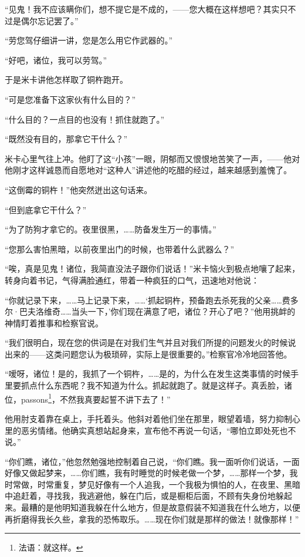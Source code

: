 \par “见鬼！我不应该瞒你们，想不提它是不成的，——您大概在这样想吧？其实只不过是偶尔忘记罢了。”
\par “劳您驾仔细讲一讲，您是怎么用它作武器的。”
\par “好吧，诸位，我可以劳驾。”
\par 于是米卡讲他怎样取了铜杵跑开。
\par “可是您准备下这家伙有什么目的？”
\par “什么目的？一点目的也没有！抓住就跑了。”
\par “既然没有目的，那拿它干什么？”
\par 米卡心里气往上冲。他盯了这“小孩”一眼，阴郁而又恨恨地苦笑了一声，——他对他刚才这样诚恳而自愿地对“这种人”讲述他的吃醋的经过，越来越感到羞愧了。
\par “这倒霉的铜杵！”他突然迸出这句话来。
\par “但到底拿它干什么？”
\par “为了防狗才拿它的。夜里很黑，……防备发生万一的事情。”
\par “您那么害怕黑暗，以前夜里出门的时候，也带着什么武器么？”
\par “唉，真是见鬼！诸位，我简直没法子跟你们说话！”米卡恼火到极点地嚷了起来，转身向着书记，气得满脸通红，带着一种疯狂的口气，迅速地对他说：
\par “你就记录下来，……马上记录下来，……‘抓起铜杵，预备跑去杀死我的父亲……费多尔·巴夫洛维奇……当头一下，’你们现在满意了吧，诸位？开心了吧？”他用挑衅的神情盯着推事和检察官说。
\par “我们很明白，现在您的供词是在对我们生气并且对我们所提的问题发火的时候说出来的——这类问题您认为极琐碎，实际上是很重要的。”检察官冷冷地回答他。
\par “嗳呀，诸位！是的，我抓了一个铜杵，……是的，为什么在发生这类事情的时候手里要抓点什么东西呢？我不知道为什么。抓起就跑了。就是这样子。真丢脸，诸位，passons\footnote{法语：就这样。}，不然我真要起誓不讲下去了！”
\par 他用肘支着靠在桌上，手托着头。他斜对着他们坐在那里，眼望着墙，努力抑制心里的恶劣情绪。他确实真想站起身来，宣布他不再说一句话，“哪怕立即处死也不说。”
\par “你们瞧，诸位，”他忽然勉强地控制着自己说，“你们瞧。我一面听你们说话，一面好像又做起梦来，……你们瞧，我有时睡觉的时候老做一个梦，……那样一个梦，我时常做，时常重复，梦见好像有一个人追我，一个我极为惧怕的人，在夜里、黑暗中追赶着，寻找我，我逃避他，躲在门后，或是橱柜后面，不顾有失身份地躲起来。最糟的是他明知道我躲在什么地方，但是故意假装不知道我在什么地方，以便再折磨得我长久些，拿我的恐怖取乐。……现在你们就是那样的做法！就像那样！”
